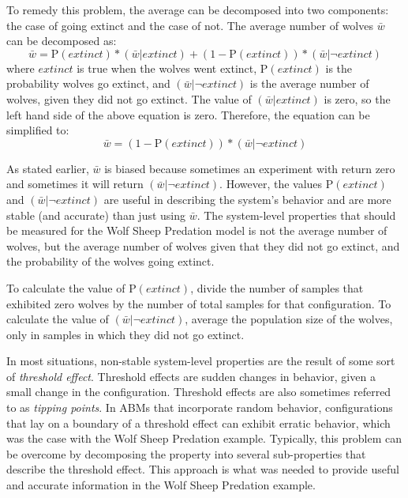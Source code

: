 
To remedy this problem, the average can be decomposed into two components: the case of going extinct and the case of not.
The average number of wolves $\bar w$ can be decomposed as:
\[\bar w = \mathrm{P}(extinct) * (\bar w | extinct) + (1 - \mathrm{P}(extinct)) * (\bar w | \neg extinct) \]
where $extinct$ is true when the wolves went extinct, $\mathrm{P}(extinct)$ is the probability wolves go extinct, and $(\bar w | \neg extinct)$ is the average number of wolves, given they did not go extinct.
The value of $(\bar w | extinct)$ is zero, so the left hand side of the above equation is zero.
Therefore, the equation can be simplified to:
\[\bar w = (1 - \mathrm{P}(extinct)) * (\bar w | \neg extinct) \]

As stated earlier, $\bar w$ is biased because sometimes an experiment with return zero and sometimes it will return $(\bar w | \neg extinct)$.
However, the values $\mathrm{P}(extinct)$ and $(\bar  w | \neg extinct)$ are useful in describing the system's behavior and are more stable (and accurate) than just using $\bar w$.
The system-level properties that should be measured for the Wolf Sheep Predation model is not the average number of wolves, but the average number of wolves given that they did not go extinct, and the probability of the wolves going extinct.

To calculate the value of $\mathrm{P}(extinct)$, divide the number of samples that exhibited zero wolves by the number of total samples for that configuration.
To calculate the value of $(\bar w | \neg extinct)$, average the population size of the wolves, only in samples in which they did not go extinct.

In most situations, non-stable system-level properties are the result of some sort of \textit{threshold effect}.
Threshold effects are sudden changes in behavior, given a small change in the configuration.
Threshold effects are also sometimes referred to as \textit{tipping points}.
In ABMs that incorporate random behavior, configurations that lay on a boundary of a threshold effect can exhibit erratic behavior, which was the case with the Wolf Sheep Predation example.
Typically, this problem can be overcome by decomposing the property into several sub-properties that describe the threshold effect. 
This approach is what was needed to provide useful and accurate information in the Wolf Sheep Predation example.


